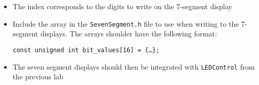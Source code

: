 \begin{itemize}
  \item The index corresponds to the digits to write on the 7-segment display

  \item Include the array in the \texttt{SevenSegment.h} file to use when writing to the 7-segment displays. The arrays shoulder have the following format:

    \begin{center}
      \texttt{const unsigned int bit\_values[16] = \{\ldots\};}
    \end{center}

  \item The seven segment displays should then be integrated with \texttt{LEDControl} from the previous lab

\end{itemize}



